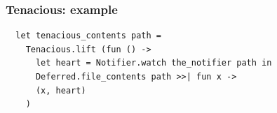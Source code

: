\documentclass{beamer}
\begin{document}
%




\begin{frame}[fragile]
\frametitle{Tenacious: example}
{\footnotesize
\begin{verbatim}
  let tenacious_contents path =
    Tenacious.lift (fun () ->
      let heart = Notifier.watch the_notifier path in
      Deferred.file_contents path >>| fun x ->
      (x, heart)
    )
 
\end{verbatim}}
\end{frame}




\begin{frame}[fragile]
\huge
\begin{center}
\end{center}
\end{frame}
\end{document}
